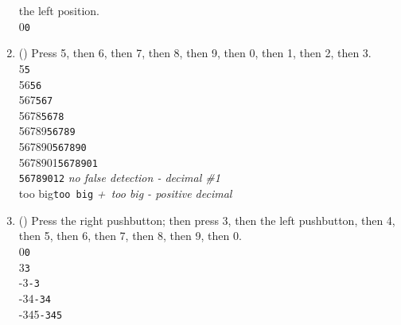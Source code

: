 \begin{enumerate}
    the left position. \\
    {\dviiseg \phantom{0000000}0}\hspace{1cm}\texttt{0}
\item (\phantom{xxx}) Press 5, then 6, then 7, then 8, then 9, then 0, then 1, then 2, then 3. \\
    {\dviiseg \phantom{0000000}5}\hspace{1cm}\texttt{5} \\
    {\dviiseg \phantom{000000}56}\hspace{1cm}\texttt{56} \\
    {\dviiseg \phantom{00000}567}\hspace{1cm}\texttt{567} \\
    {\dviiseg \phantom{0000}5678}\hspace{1cm}\texttt{5678} \\
    {\dviiseg \phantom{000}56789}\hspace{1cm}\texttt{56789} \\
    {\dviiseg \phantom{00}567890}\hspace{1cm}\texttt{567890} \\
    {\dviiseg \phantom{0}5678901}\hspace{1cm}\texttt{5678901} \\
    {}\hspace{1cm}\texttt{56789012}\hspace{1cm}
    \textit{no false detection - decimal \#1} \\
    {\dviiseg \phantom{0}too big}\hspace{1cm}\texttt{too big}\hspace{1cm}
    \textit{+\textonequarter\ too big - positive decimal}
\item (\phantom{xxx}) Press the right pushbutton; then press 3, then the left pushbutton, then 4, then 5, then 6, then 7, then 8, then 9, then 0. \\
    {\dviiseg \phantom{0000000}0}\hspace{1cm}\texttt{0} \\
    {\dviiseg \phantom{0000000}3}\hspace{1cm}\texttt{3} \\
    {\dviiseg \phantom{000000}-3}\hspace{1cm}\texttt{-3} \\
    {\dviiseg \phantom{00000}-34}\hspace{1cm}\texttt{-34} \\
    {\dviiseg \phantom{0000}-345}\hspace{1cm}\texttt{-345} \\

\end{enumerate}
